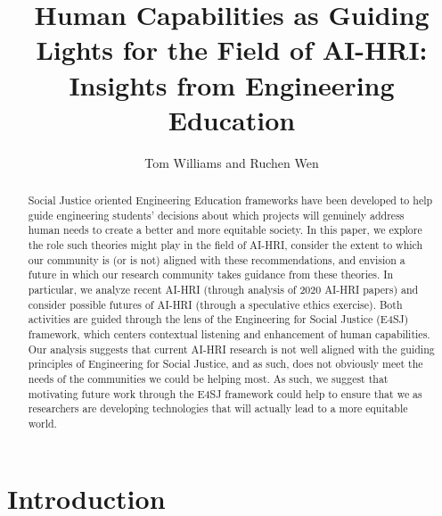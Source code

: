 \documentclass[letterpaper]{article} %
\title{Human Capabilities as Guiding Lights for the Field of AI-HRI:\\ Insights from Engineering Education}
\author {
    Tom Williams and Ruchen Wen\\
}
\begin{document}
\maketitle

\begin{abstract}
Social Justice oriented Engineering Education frameworks have been developed to help guide engineering students' decisions about which projects will genuinely address human needs to create a better and more equitable society.
In this paper, we explore the role such theories might play in the field of AI-HRI,
consider the extent to which our community is (or is not) aligned with these recommendations, and envision a future in which our research community takes guidance from these
theories. In particular, we analyze recent AI-HRI (through analysis of 2020 AI-HRI papers) and consider possible  futures of AI-HRI (through a speculative ethics exercise). Both activities are guided through the lens of the Engineering for Social Justice (E4SJ) framework, which centers contextual listening and enhancement of human capabilities. Our analysis suggests that current AI-HRI research is not well aligned with the  guiding principles of Engineering for Social Justice, and as such, does not obviously meet the needs of the communities we could be helping most. As such, we suggest that motivating future work through the E4SJ framework could help to ensure that we as researchers are developing technologies that will actually lead to a more equitable world.
\end{abstract}

\section{Introduction}
\end{document}
